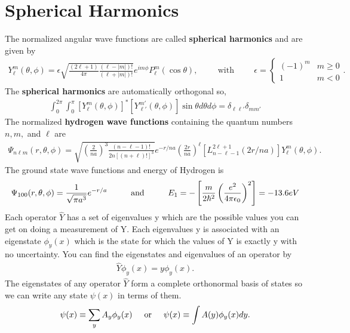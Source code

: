 \section{Spherical Harmonics}
The normalized angular wave functions are called \textbf{spherical harmonics} and are given by
\begin{align}
	Y_\ell^m(\theta,\phi) = \epsilon\sqrt{\frac{(2\ell+1)}{4\pi}\frac{(\ell-|m|)!}{(\ell+|m|)!}}e^{im\phi}P_\ell^m(\cos\theta), \hspace{1cm} \textrm{with} \hspace{1cm}\epsilon = \begin{cases} (-1)^m & m \geq 0 \\ 1 & m < 0 \end{cases}.
\end{align}
The \textbf{spherical harmonics} are automatically orthogonal so,
\begin{align}
	\int_0^{2\pi}\int_0^\pi[Y_\ell^m(\theta,\phi)]^*[Y_{\ell'}^{m'}(\theta,\phi)]\sin\theta d\theta d\phi=\delta_{\ell \ell'}\delta_{m m'}
\end{align}
The normalized \textbf{hydrogen wave functions} containing the quantum numbers $n, m,$ and $\ell$ are
\begin{align}
	\Psi_{n\ell m}(r,\theta,\phi) = \sqrt{\left(\frac{2}{na}\right)^3\frac{(n-\ell-1)!}{2n[(n+\ell)!]^3}}e^{-r/na}\left(\frac{2r}{na}\right)^\ell\left[L_{n-\ell-1}^{2\ell+1}(2r/na)\right]Y_{\ell}^{m}(\theta,\phi).
\end{align}
The ground state wave functions and energy of Hydrogen is
\begin{align}
	\Psi_{100}(r,\theta,\phi) = \frac{1}{\sqrt{\pi a^3}}e^{-r/a} \andspace{1cm} E_1 = -\left[\frac{m}{2\hbar^2}\left(\frac{e^2}{4\pi\epsilon_0}\right)^2\right] = -13.6 eV
\end{align}
Each operator $\hat{Y}$ has a set of eigenvalues y which are the possible values you can get on doing a measurement of Y. Each eigenvalues y is associated with an eigenstate $\phi_y(x)$ which is the state for which the values of Y is exactly y with no uncertainty. You can find the eigenstates and eigenvalues of an operator by 
\begin{align}
	\hat{Y}\phi_y(x) = y \phi_y(x).
\end{align}
The eigenstates of any operator $\hat{Y}$ form a complete orthonormal basis of states so we can write any state $\psi(x)$ in terms of them.
\begin{align}
	\psi(x) \equiv \sum_{y}A_y\phi_y(x) \hspace{0.5cm}\textrm{or}\hspace{0.5cm} \psi(x) \equiv \int A(y)\phi_y(x)dy.
\end{align}
